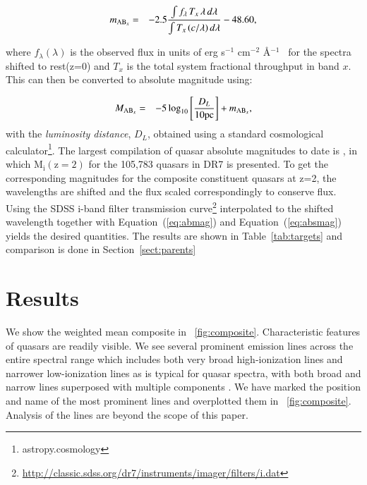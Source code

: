 \documentclass{aa}    %
\newcommand{\figref}[1]{\ref{fig:#1}}
\newcommand{\Fig}[1]{\figurename~\figref{#1}}
\newcommand{\fig}[1]{\Fig{#1}}
\newcommand{\Tab}[1]{Table~\ref{tab:#1}}
\newcommand{\tab}[1]{\Tab{#1}}
\newcommand{\Eq}[1]{Equation~(\ref{eq:#1})}
\newcommand{\eq}[1]{\Eq{#1}}
\newcommand{\eqlabel}[1]{\label{eq:#1}}
\newcommand{\sectionname}{Section}
\newcommand{\Sect}[1]{\sectionname~\ref{sect:#1}}
\newcommand{\sect}[1]{\Sect{#1}}
\newcommand{\sectlabel}[1]{\label{sect:#1}}
\newcommand{\fluxunit}{erg s$^{-1}$ cm$^{-2}$ \AA$^{-1}$}
\begin{document}
\begin{eqnarray}\eqlabel{abmag}
m_{\textmd{AB}_x} &=& -2.5  \frac{\int f_\lambda \,  T_{x}  \, \lambda \,  d\lambda} 
{\int  T_{x} \,  (c / \lambda) \,  d\lambda}  - 48.60,
\end{eqnarray}
 
 
where $f_\lambda (\lambda)$ is the observed flux in units of \fluxunit~ for the spectra shifted to rest(z=0) and $T_{x} $ is the total system fractional throughput in band $x$. This can then be converted to absolute magnitude using:

\begin{eqnarray}\eqlabel{absmag}
M_{\textmd{AB}_x} &=& -5 \log_{10} \left[  \frac{D_L }{10 \mathrm{pc}}   \right] + m_{\textmd{AB}_x} ,
\end{eqnarray}
with the \textit{luminosity distance}, $D_L$,  obtained using a standard cosmological calculator\footnote{astropy.cosmology}.
 The largest compilation of quasar absolute magnitudes to date is \cite{Shen2011}, in which $\mathrm{M_i (z=2)}$ for the 105,783 quasars in DR7 is presented. To get the corresponding magnitudes for the composite constituent quasars at z=2, the wavelengths are shifted and the flux scaled correspondingly to conserve flux. Using the SDSS i-band filter transmission curve\footnote{\url{http://classic.sdss.org/dr7/instruments/imager/filters/i.dat}} interpolated to the shifted wavelength together with \eq{abmag} and \eq{absmag} yields the desired quantities. The results are shown in \tab{targets} and comparison is done in \sect{parents}







\section{Results}   \sectlabel{results}


We show the weighted mean composite in \fig{composite}. Characteristic features of quasars are readily visible. We see several prominent emission lines across the entire spectral range which includes both very broad high-ionization lines and narrower low-ionization lines as is typical for quasar spectra, with both broad and narrow lines superposed with multiple components \citep{Baldwin1995}. We have marked the position and name of the most prominent lines and overplotted them in \fig{composite}.  Analysis of the lines are beyond the scope of this paper.
\end{document}
